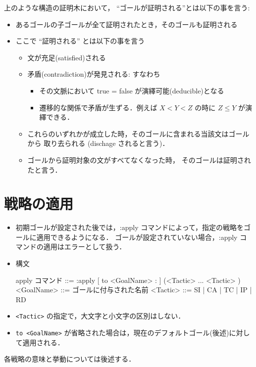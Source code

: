 \documentclass[a4paper,oneside,10pt,here]{memoir}
\newenvironment{vvtm}%
{\parskip=0pt\lineskip=0pt\begin{center}\begin{minipage}{0.8\textwidth}\begin{snugshade}}%
  {\end{snugshade}\end{minipage}\end{center}}
\begin{document}
上のような構造の証明木において， ``ゴールが証明される''とは以下の事を言う:
\begin{itemize}
\item あるゴールの子ゴールが全て証明されたとき，そのゴールも証明される
\item ここで ``証明される'' とは以下の事を言う
  \begin{itemize}
  \item 文が充足(satisfied)される
  \item 矛盾(contradiction)が発見される: すなわち
    \begin{itemize}
    \item その文脈において true = false が演繹可能(deducible)となる
    \item 遷移的な関係で矛盾が生ずる．例えば $X < Y < Z$ の時に
      $Z \le Y$ が演繹できる．
    \end{itemize}
  \item これらのいずれかが成立した時，そのゴールに含まれる当該文はゴールから
    取り去られる (dischage されると言う)．
  \item ゴールから証明対象の文がすべてなくなった時，
    そのゴールは証明されたと言う．
  \end{itemize}
\end{itemize}

\section{戦略の適用}\label{sec:apply}

\begin{itemize}
\item 初期ゴールが設定された後では，:apply コマンドによって，指定の戦略をゴールに適用できるようになる．
  ゴールが設定されていない場合，:apply コマンドの適用はエラーとして扱う．
\item 構文
  \begin{vvtm}
    \begin{simplev}
    apply コマンド ::= :apply [ to <GoalName> : ] (<Tactic> ... <Tactic> )
    <GoalName>     ::= ゴールに付与された名前
    <Tactic>       ::= SI | CA | TC | IP | RD
    \end{simplev}
  \end{vvtm}

\item \verb|<Tactic>| の指定で，大文字と小文字の区別はしない．
\item \verb|to <GoalName>| が省略された場合は，現在のデフォルトゴール(後述)に対して適用される．
\end{itemize}
各戦略の意味と挙動については後述する．
\end{document}
